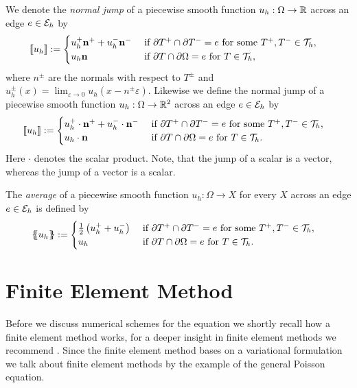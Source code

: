 \begin{definition}
We denote the \emph{normal jump} of  a piecewise smooth function $u_h:\Omega \rightarrow \mathbb{R}$ across an edge $e \in \mathcal{E}_h$ by
\begin{align*}
	\llbracket u_h \rrbracket&:= 
	\begin{cases}
		u_h^+  \mathbf n^+ + u_h^- \mathbf n^-  &\text{ if } \partial T^+ \cap \partial T^- = e \text{ for some }T^+,T^- \in \mathcal{T}_h, \\
		u_h \mathbf n 	 &\text{ if } \partial T \cap \partial \Omega = e \text{ for } T \in \mathcal{T}_h,
	\end{cases}	
\end{align*}
where $n^\pm$ are the normals with respect to $T^\pm$ and  $u_h^\pm(x) = \lim_{\varepsilon \rightarrow 0} u_h(x-n^\pm \varepsilon)$.
Likewise we define the normal jump of a piecewise smooth function $u_h:\Omega \rightarrow \mathbb{R}^2$ across an edge $e \in \mathcal{E}_h$ by
\begin{align*}
	\llbracket u_h \rrbracket&:= 
	\begin{cases}
		u_h^+ \cdot \mathbf n^+ + u_h^-\cdot  \mathbf n^-  &\text{ if } \partial T^+ \cap \partial T^- = e \text{ for some }T^+,T^- \in \mathcal{T}_h,\\
		u_h\cdot \mathbf n 	 &\text{ if } \partial T \cap \partial \Omega = e \text{ for }T\in \mathcal{T}_h.
	\end{cases}	
\end{align*}
Here $\cdot$ denotes the scalar product.
Note, that the jump of a scalar is a vector, whereas the jump of a vector is a scalar.

The \emph{average} of a piecewise smooth function $u_h:\Omega \rightarrow X$ for every $X$ across an edge $e \in \mathcal{E}_h$ is defined by
\begin{align*}
	\{\!\!\{ u_h \}\!\!\} &:= 
	\begin{cases}
	\frac 1 2 \left(u_h^+ + u_h^-\right) &\text{ if } \partial T^+ \cap \partial T^- = e \text{ for some }T^+,T^- \in \mathcal{T}_h, \\
	 u_h &\text{ if } \partial T \cap \partial \Omega = e \text{ for }T\in \mathcal{T}_h.
	\end{cases}
\end{align*}
\end{definition}


\section{Finite Element Method}
Before we discuss numerical schemes for the \MA equation we shortly recall how a finite element method works, for a deeper insight in finite element methods we recommend \cite{Braess2003, BS2002}. Since the finite element method bases on a variational formulation we talk about finite element methods by the example of the general Poisson equation. 

